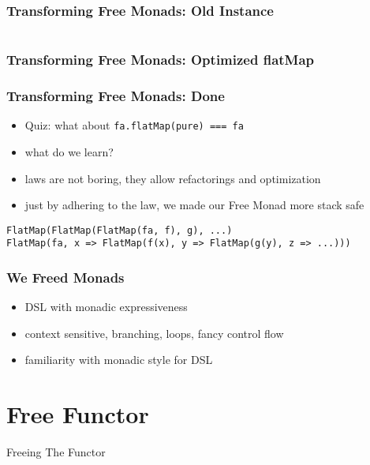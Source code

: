 \documentclass{beamer}
\begin{document}
\begin{frame}[fragile]
  \frametitle{Transforming Free Monads: Old Instance}
  \begin{center}
    \inputminted[highlightlines={5-7}, highlightcolor=yellow!40]{scala}{snippets/free-instance.scala}
  \end{center}
\end{frame}

\begin{frame}[fragile]
  \frametitle{Transforming Free Monads: Optimized flatMap}
\end{frame}

\begin{frame}[fragile]
  \frametitle{Transforming Free Monads: Done}
  \begin{itemize}
  \item Quiz: what about \texttt{fa.flatMap(pure) === fa}
  \item what do we learn?
  \item laws are not boring, they allow refactorings and optimization
  \item just by adhering to the law, we made our Free Monad more stack safe
  \end{itemize}
  \begin{verbatim}
FlatMap(FlatMap(FlatMap(fa, f), g), ...)
FlatMap(fa, x => FlatMap(f(x), y => FlatMap(g(y), z => ...)))
  \end{verbatim}
\end{frame}

\begin{frame}
  \frametitle{We Freed Monads}
  \begin{itemize}
  \item DSL with monadic expressiveness
  \item context sensitive, branching, loops, fancy control flow
  \item familiarity with monadic style for DSL
  \end{itemize}
\end{frame}

\section{Free Functor}\label{sec:free-functor}
\begin{frame}
  \begin{center}
    \Huge
    Freeing The Functor
  \end{center}
\end{frame}
\end{document}
